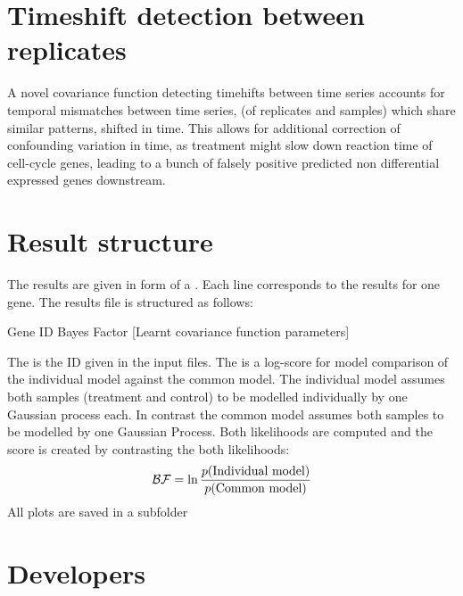 \documentclass[letterpaper,10pt,english]{sphinxmanual}
\begin{document}
\chapter{Timeshift detection between replicates}
\label{timeshift:timeshift}\label{timeshift::doc}\label{timeshift:timeshift-detection-between-replicates}
A novel covariance function detecting timehifts between
time series accounts for temporal mismatches between time series, (of
replicates and samples) which share similar patterns, shifted in
time. This allows for additional correction of confounding variation
in time, as treatment might slow down reaction time of cell-cycle
genes, leading to a bunch of falsely positive predicted non differential
expressed genes downstream.


\chapter{Result structure}
\label{results:result-structure}\label{results::doc}\label{results:results}
The results are given in form of a . Each line corresponds to the results for one gene. The results file is structured as follows:

\begin{DUlineblock}{0em}
\item[] Gene ID \textbar{} Bayes Factor \textbar{} {[}Learnt covariance function parameters{]} \textbar{}
\end{DUlineblock}

The  is the ID given in the input files. The  is a log-score for model comparison of the individual model against the common model. The individual model assumes both samples (treatment and control) to be modelled individually by one Gaussian process each. In contrast the common model assumes both samples to be modelled by one Gaussian Process. Both likelihoods are computed and the score is created by contrasting the both likelihoods:
\begin{gather}
\begin{split}\mathcal{BF} = \ln \frac{p(\text{Individual model})}{p(\text{Common model})}\end{split}\notag
\end{gather}
All plots are saved in a subfolder 


\chapter{Developers}
\label{index:developers}\label{base:module-gptwosample}
\end{document}
